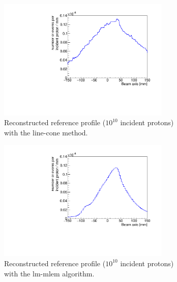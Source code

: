 \begin{figure}
  \centering
  \begin{subfigure}[t]{.49\textwidth}
  \includegraphics[width=0.9\textwidth]{03_GraphicFiles/chapter4_HTsimu/new/reconstructed_histStat_profile_lineCone_norm.pdf}
  \caption{Reconstructed reference profile ($10^{10}$ incident protons) with the line-cone method.}
  \label{fig:fig_Results_Estimation_Camera_Profil_highStat_CC_simulation_Hadronth_LineCone}
 \end{subfigure}
  \begin{subfigure}[t]{.49\textwidth}
  \includegraphics[width=0.9\textwidth]{03_GraphicFiles/chapter4_HTsimu/new/reconstructed_histStat_profile_norm.pdf}
  \caption{Reconstructed reference profile ($10^{10}$ incident protons) with the \gls{lm-mlem} algorithm.}
  \label{fig:fig_Results_Estimation_Camera_Profil_highStat_CC_simulation_Hadronth_MLEM}
 \end{subfigure}
  \begin{subfigure}[t]{.49\textwidth}

\end{subfigure}
\end{figure}
